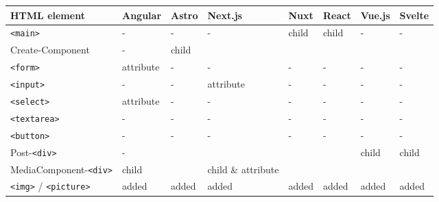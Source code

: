 \documentclass[a4paper, 12pt]{article}
\begin{document}
\begin{table}[!ht]
  \centering
  \begin{adjustbox}{angle=90}
    \begin{tabular}{|l|l|l|l|l|l|l|l|}
      \hline
      \textbf{HTML element}           & \textbf{Angular}  & \textbf{Astro}  & \textbf{Next.js}    & \textbf{Nuxt} & \textbf{React}  & \textbf{Vue.js} & \textbf{Svelte} \\ \hline
      \verb|<main>|                   & -                 & -               & -                   & child         & child           & -               & -               \\ \hline
      Create-Component                & -                 & child           & ~                   & ~             & ~               & ~               & ~               \\ \hline
      \verb|<form>|                   & attribute         & -               & -                   & -             & -               & -               & -               \\ \hline
      \verb|<input>|                  & -                 & -               & attribute           & -             & -               & -               & -               \\ \hline
      \verb|<select>|                 & attribute         & -               & -                   & -             & -               & -               & -               \\ \hline
      \verb|<textarea>|               & -                 & -               & -                   & -             & -               & -               & -               \\ \hline
      \verb|<button>|                 & -                 & -               & -                   & -             & -               & -               & -               \\ \hline
      Post-\verb|<div>|               & -                 & ~               & ~                   & ~             & ~               & child           & child           \\ \hline
      MediaComponent-\verb|<div>|     & child             & ~               & child \& attribute  & ~             & ~               & ~               & ~               \\ \hline
      \verb|<img>| / \verb|<picture>| & added             & added           & added               & added         & added           & added           & added           \\ \hline

\end{tabular}
\end{adjustbox}
\end{table}
\end{document}
